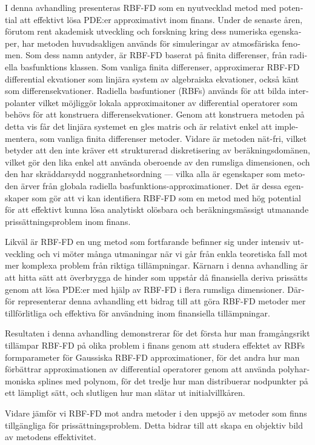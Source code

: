 \documentclass{UUThesisTemplate}
\begin{document}
\begin{swedish}
{I denna avhandling presenteras RBF-FD som en nyutvecklad metod med potential att effektivt lösa PDE:er approximativt inom finans.
Under de senaste åren, förutom rent akademisk utveckling och forskning kring dess numeriska egenskaper, har metoden huvudsakligen används för simuleringar av atmosfäriska fenomen.
Som dess namn antyder, är RBF-FD baserat på finita differenser, från radiella basfunktions klassen.
Som vanliga finita differenser, approximerar RBF-FD differential ekvationer som linjära system av algebraiska ekvationer, också känt som differensekvationer.
Radiella basfuntioner (RBFs) används för att bilda interpolanter vilket möjliggör lokala approximaitoner av differential operatorer som behövs för att konstruera differensekvationer.
Genom att konstruera metoden på detta vis får det linjära systemet en gles matris
och är relativt enkel att implementera, som vanliga finita differenser metoder.
Vidare är metoden nät-fri, vilket betyder att den inte kräver ett strukturerad diskretisering av beräkningsdomänen, vilket gör den lika enkel att använda oberoende av den rumsliga dimensionen, och den har skräddarsydd noggranhetsordning --- vilka alla är egenskaper som metoden ärver från globala radiella basfunktions-approximationer.
Det är dessa egenskaper som gör att vi kan identifiera RBF-FD som en metod med hög potential för att effektivt kunna lösa analytiskt olösbara och beräkningsmässigt utmanande prissättningsproblem inom finans.

Likväl är RBF-FD en ung metod som fortfarande befinner sig under intensiv utveckling
och vi möter många utmaningar när vi går från enkla teoretiska fall mot mer komplexa problem från riktiga tillämpningar.
Kärnarn i denna avhandling är att hitta sätt att överbrygga de hinder som uppstår då finansiella deriva prissätts genom att lösa PDE:er med hjälp av RBF-FD i flera rumsliga dimensioner.  
Därför representerar denna avhandling ett bidrag till att göra RBF-FD metoder mer tillförlitliga och effektiva för användning inom finansiella tillämpningar.

Resultaten i denna avhandling demonstrerar för det första hur man framgångsrikt tillämpar RBF-FD på olika problem i finans genom att studera effektet av RBFs formparameter för Gaussiska RBF-FD approximationer,
för det andra hur man förbättrar approximationen av differential operatorer genom att använda polyharmoniska splines med polynom, för det tredje hur man distribuerar nodpunkter på ett lämpligt sätt, och slutligen hur man slätar ut initialvillkåren.

Vidare jämför vi RBF-FD mot andra metoder i den uppsjö av metoder som finns tillgängliga för prissättningsproblem. Detta bidrar till att skapa en objektiv bild av metodens effektivitet.
}
\end{swedish}
\end{document}
